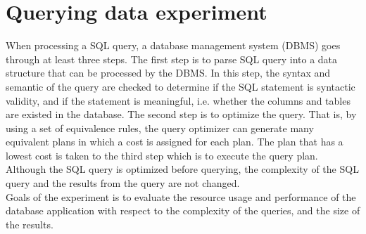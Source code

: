 \section{Querying data experiment}
When processing a SQL query, a database management system (DBMS) goes through at least three steps. The first step is to parse SQL query into a data structure that can be processed by the DBMS. In this step, the syntax and semantic of the query are checked to determine if the SQL statement is syntactic validity, and if the statement is meaningful, i.e. whether the columns and tables are existed in the database. The second step is to optimize the query. That is, by using a set of equivalence rules, the query optimizer can generate many equivalent plans in which a cost is assigned for each plan. The plan that has a lowest cost is taken to the third step which is to execute the query plan. Although the SQL query is optimized before querying, the complexity of the SQL query and the results from the query are not changed.\\
Goals of the experiment is to evaluate the resource usage and performance of the database application with respect to the complexity of the queries, and the size of the results.
